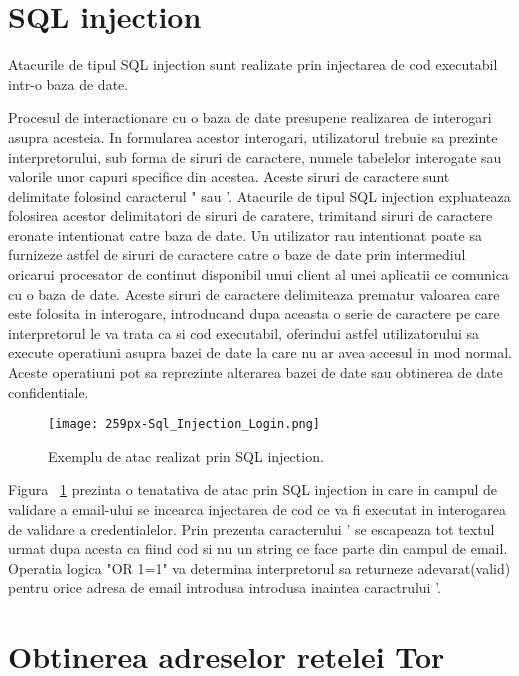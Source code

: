 \section{SQL injection}

Atacurile de tipul SQL injection sunt realizate prin injectarea de cod executabil intr-o baza de date.

Procesul de interactionare cu o baza de date presupene realizarea de interogari asupra acesteia. In formularea acestor interogari, utilizatorul trebuie sa prezinte interpretorului, sub forma de siruri de caractere, numele tabelelor interogate sau valorile unor capuri specifice din acestea. Aceste siruri de caractere sunt delimitate folosind caracterul " sau '. Atacurile de tipul SQL injection expluateaza folosirea acestor delimitatori de siruri de caratere, trimitand siruri de caractere eronate intentionat catre baza de date. Un utilizator rau intentionat poate sa furnizeze astfel de siruri de caractere catre o baze de date prin intermediul oricarui procesator de continut disponibil unui client al unei aplicatii ce comunica cu o baza de date. Aceste siruri de caractere delimiteaza prematur valoarea care este folosita in interogare, introducand dupa aceasta o serie de caractere pe care interpretorul le va trata ca si cod executabil, oferindui astfel utilizatorului sa execute operatiuni asupra bazei de date la care nu ar avea accesul in mod normal. Aceste operatiuni pot sa reprezinte alterarea bazei de date sau obtinerea de date confidentiale. \\



\begin{figure}[h]
	\centering
	\texttt{[image: 259px-Sql\_Injection\_Login.png]}
	\caption{Exemplu de atac realizat prin SQL injection.}
	\label{fig:sqli-example}
\end{figure}

Figura ~\ref{fig:sqli-example} prezinta o tenatativa de atac prin SQL injection in care in campul de validare a email-ului se incearca injectarea de cod ce va fi executat in interogarea de validare a credentialelor. Prin prezenta caracterului ' se escapeaza tot textul urmat dupa acesta ca fiind cod si nu un string ce face parte din campul de email. Operatia logica "OR 1=1" va determina interpretorul sa returneze adevarat(valid) pentru orice adresa de email introdusa introdusa inaintea caractrului '. \\
\section{Obtinerea adreselor retelei Tor}

